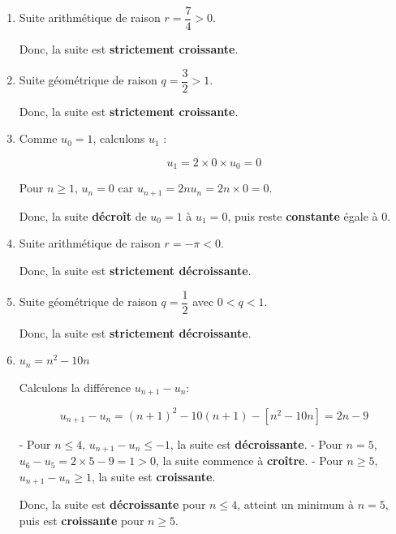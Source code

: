 \documentclass{article}
\begin{document}
\begin{enumerate}[label=\alph*)]

\item Suite arithmétique de raison \( r = \dfrac{7}{4} > 0 \).

Donc, la suite est \textbf{strictement croissante}.

\bigskip

\item Suite géométrique de raison \( q = \dfrac{3}{2} > 1 \).

Donc, la suite est \textbf{strictement croissante}.

\bigskip

\item Comme \( u_0 = 1 \), calculons \( u_1 \) :

\[ u_1 = 2 \times 0 \times u_0 = 0 \]

Pour \( n \geq 1 \), \( u_n = 0 \) car \( u_{n+1} = 2n u_n = 2n \times 0 = 0 \).

Donc, la suite \textbf{décroît} de \( u_0 = 1 \) à \( u_1 = 0 \), puis reste \textbf{constante} égale à 0.

\bigskip

\item Suite arithmétique de raison \( r = -\pi < 0 \).

Donc, la suite est \textbf{strictement décroissante}.

\bigskip

\item Suite géométrique de raison \( q = \dfrac{1}{2} \) avec \( 0 < q < 1 \).

Donc, la suite est \textbf{strictement décroissante}.

\bigskip

\item \( u_n = n^2 - 10n \)

Calculons la différence \( u_{n+1} - u_n \):

\[ u_{n+1} - u_n = (n+1)^2 - 10(n+1) - [n^2 - 10n] = 2n - 9 \]

- Pour \( n \leq 4 \), \( u_{n+1} - u_n \leq -1 \), la suite est \textbf{décroissante}.
- Pour \( n = 5 \), \( u_{6} - u_{5} = 2 \times 5 - 9 = 1 > 0 \), la suite commence à \textbf{croître}.
- Pour \( n \geq 5 \), \( u_{n+1} - u_n \geq 1 \), la suite est \textbf{croissante}.

Donc, la suite est \textbf{décroissante} pour \( n \leq 4 \), atteint un minimum à \( n = 5 \), puis est \textbf{croissante} pour \( n \geq 5 \).

\end{enumerate}
\end{document}
